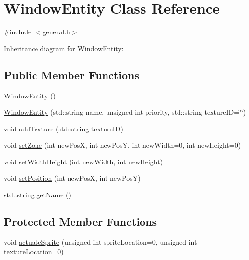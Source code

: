 \hypertarget{class_window_entity}{\section{Window\-Entity Class Reference}
\label{class_window_entity}
}


{\ttfamily \#include $<$general.\-h$>$}



Inheritance diagram for Window\-Entity\-:
\subsection*{Public Member Functions}
\begin{DoxyCompactItemize}
\item 
\hyperlink{class_window_entity_a71a1caf18fda6493100336a84bf62715}{Window\-Entity} ()
\item 
\hyperlink{class_window_entity_a13def047f2a274c96d5d5392c3787dca}{Window\-Entity} (std\-::string name, unsigned int priority, std\-::string texture\-I\-D=\char`\"{}\char`\"{})
\item 
void \hyperlink{class_window_entity_aaad393d6c9f9f39266f300d930b4cebd}{add\-Texture} (std\-::string texture\-I\-D)
\item 
void \hyperlink{class_window_entity_a96642f3afc1b32491408f32f7b630de5}{set\-Zone} (int new\-Pos\-X, int new\-Pos\-Y, int new\-Width=0, int new\-Height=0)
\item 
void \hyperlink{class_window_entity_ab7346c852b1170154bb29d789e6ab3bc}{set\-Width\-Height} (int new\-Width, int new\-Height)
\item 
void \hyperlink{class_window_entity_ac4b71542f91338a80ea5189b87690699}{set\-Position} (int new\-Pos\-X, int new\-Pos\-Y)
\item 
std\-::string \hyperlink{class_window_entity_a0073a5b9c6d678b090a6b8b6b10c32e3}{get\-Name} ()
\end{DoxyCompactItemize}
\subsection*{Protected Member Functions}
\begin{DoxyCompactItemize}
\item 
void \hyperlink{class_window_entity_a5fc97093d697211a8685fad3115d5e30}{actuate\-Sprite} (unsigned int sprite\-Location=0, unsigned int texture\-Location=0)
\end{DoxyCompactItemize}
